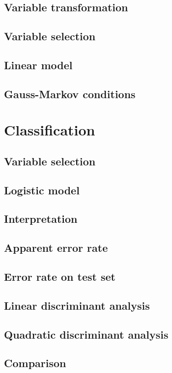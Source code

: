 \documentclass[a4paper, 12pt]{article}
\begin{document}
\subsection*{Variable transformation}
\subsection*{Variable selection}
\subsection*{Linear model}
\subsection*{Gauss-Markov conditions}

\section{Classification}
\subsection*{Variable selection}
\subsection*{Logistic model}
\subsection*{Interpretation}
\subsection*{Apparent error rate}
\subsection*{Error rate on test set}
\subsection*{Linear discriminant analysis}
\subsection*{Quadratic discriminant analysis}
\subsection*{Comparison}

\end{document}
